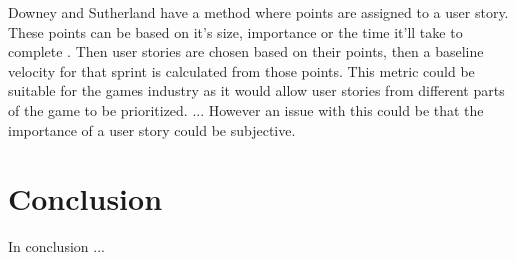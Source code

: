 \documentclass{scrartcl}
\begin{document}

Downey and Sutherland have a method where points are assigned to a user story. These points can be based on it's size, importance or the time it'll take to complete \cite{Downey}. Then user stories are chosen based on their points, then a baseline velocity for that sprint is calculated from those points. This metric could be suitable for the games industry as it would allow user stories from different parts of the game to be prioritized. ... However an issue with this could be that the importance of a user story could be subjective. 






\section{Conclusion}
In conclusion ...
	


	
\end{document}
